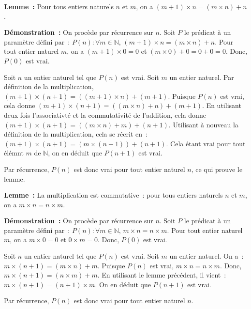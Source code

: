 \noindent\textbf{Lemme :} Pour tous entiers naturels $n$ et $m$, on a $(m+1) \times n = (m \times n) + n$.

\medskip

\noindent\textbf{Démonstration :} On procède par récurrence sur $n$. 
    Soit $P$ le prédicat à un paramètre défini par : $P(n): \forall m \in \mathbb{N}, \, (m+1) \times n = (m \times n) + n$. 
    Pour tout entier naturel $m$, on a $(m+1) \times 0 = 0$ et $(m \times 0) + 0 = 0 + 0 = 0$. 
    Donc, $P(0)$ est vrai. 

    Soit $n$ un entier naturel tel que $P(n)$ est vrai. 
    Soit $m$ un entier naturel. 
    Par définition de la multiplication, $(m+1) \times (n+1) = ((m+1) \times n) + (m+1)$. 
    Puisque $P(n)$ est vrai, cela donne $(m+1) \times (n+1) = ((m \times n) + n) + (m+1)$. 
    En utilisant deux fois l'associativté et la commutativité de l'addition, cela donne $(m+1) \times (n+1) = ((m \times n) + m) + (n+1)$. 
    Utilisant à nouveau la définition de la multiplication, cela se récrit en : $(m+1) \times (n+1) = (m \times (n+1)) + (n+1)$. 
    Cela étant vrai pour tout élémnt $m$ de $\mathbb{N}$, on en déduit que $P(n+1)$ est vrai. 

    Par récurrence, $P(n)$ est donc vrai pour tout entier naturel $n$, ce qui prouve le lemme.

   \done 

\medskip

\noindent\textbf{Lemme :} La multiplication est commutative : pour tous entiers naturels $n$ et $m$, on a $m \times n = n \times m$.

\medskip

\noindent\textbf{Démonstration :} On procède par récurrence sur $n$. 
    Soit $P$ le prédicat à un paramètre défini par : $P(n): \forall m \in \mathbb{N}, \, m \times n = n \times m$. 
    Pour tout entier naturel $m$, on a $m \times 0 = 0$ et $0 \times m = 0$. 
    Donc, $P(0)$ est vrai. 

    Soit $n$ un entier naturel tel que $P(n)$ est vrai. 
    Soit $m$ un entier naturel. 
    On a : $m \times (n+1) = (m \times n) + m$. 
    Puisque $P(n)$ est vrai, $m \times n = n \times m$. 
    Donc, $m \times (n+1) = (n \times m) + m$. 
    En utilisant le lemme précédent, il vient : $m \times (n+1) = (n+1) \times m$. 
    On en déduit que $P(n+1)$ est vrai. 

    Par récurrence, $P(n)$ est donc vrai pour tout entier naturel $n$. 

   \done 


